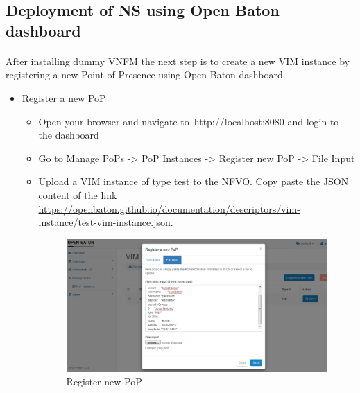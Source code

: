 			\subsection*{Deployment of NS using Open Baton dashboard}
			\paragraph{}
			After installing dummy VNFM the next step is to create a new VIM instance by registering a new Point of Presence using Open Baton dashboard.
			\begin{itemize}
				\item Register a new PoP
				\begin{itemize}
					\item Open your browser and navigate to http://localhost:8080 and login to the dashboard
					\item Go to Manage PoPs -> PoP Instances -> Register new PoP -> File Input
					\item Upload a VIM instance of type test to the NFVO. Copy paste the JSON content of the link 	\hyperlink{name}{https://openbaton.github.io/documentation/descriptors/vim-instance/test-vim-instance.json}. 
					\begin{figure} [h]
						\centering
						\includegraphics[width=0.7\linewidth]{figures/registerPoP}
						\caption{Register new PoP}
						\label{fig:registerPoP}
					\end{figure}
				\end{itemize}
			

\end{itemize}
